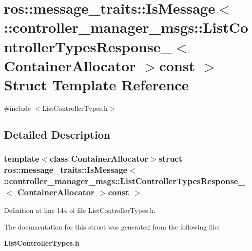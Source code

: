 \section{ros\-:\-:message\-\_\-traits\-:\-:\-Is\-Message$<$ \-:\-:controller\-\_\-manager\-\_\-msgs\-:\-:\-List\-Controller\-Types\-Response\-\_\-$<$ \-Container\-Allocator $>$const $>$ \-Struct \-Template \-Reference}
\label{structros_1_1message__traits_1_1IsMessage_3_01_1_1controller__manager__msgs_1_1ListControllerTyped9c43932d39cd703bfc0c2df9e61b1c}


{\ttfamily \#include $<$\-List\-Controller\-Types.\-h$>$}



\subsection{\-Detailed \-Description}
\subsubsection*{template$<$class Container\-Allocator$>$struct ros\-::message\-\_\-traits\-::\-Is\-Message$<$ \-::controller\-\_\-manager\-\_\-msgs\-::\-List\-Controller\-Types\-Response\-\_\-$<$ Container\-Allocator $>$const  $>$}



\-Definition at line 144 of file \-List\-Controller\-Types.\-h.



\-The documentation for this struct was generated from the following file\-:\begin{DoxyCompactItemize}
\item 
{\bf \-List\-Controller\-Types.\-h}\end{DoxyCompactItemize}
